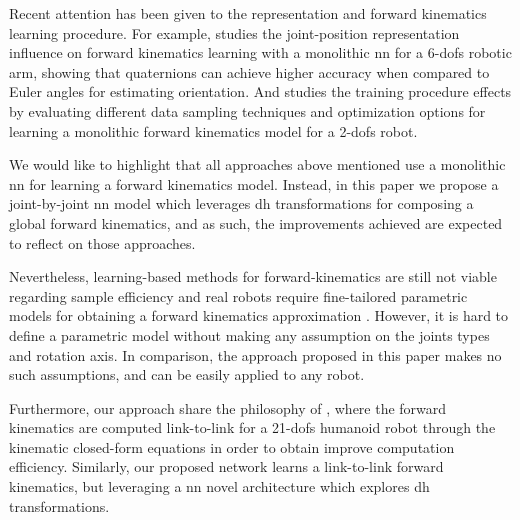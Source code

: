 Recent attention has been given to the representation and forward kinematics learning procedure.
%
For example, \cite{grassmann2019merits} studies the joint-position representation influence on forward kinematics learning  with a monolithic \gls{nn} for a 6-\glspl{dof} robotic arm, showing that quaternions can achieve higher accuracy when compared to Euler angles for estimating orientation.
%
And \cite{bouzid2024exploring} studies the training procedure effects by evaluating different data sampling techniques and optimization options for learning a monolithic forward kinematics model for a 2-\glspl{dof} robot.

We would like to highlight that all approaches above mentioned use a monolithic \gls{nn} for learning a forward kinematics model.
%
Instead, in this paper we propose a joint-by-joint \gls{nn} model which leverages \gls{dh} transformations for composing a global forward kinematics, and as such, the improvements achieved are expected to reflect on those approaches.


Nevertheless, learning-based methods for forward-kinematics are still not viable regarding sample efficiency and real robots require fine-tailored parametric models for obtaining a forward kinematics approximation \cite{kubus2018learning}.
%
However, it is hard to define a parametric model without making any assumption on the joints types and rotation axis.
%
In comparison, the approach proposed in this paper makes no such assumptions, and can be easily applied to any robot.

Furthermore, our approach share the philosophy of \cite{gonccalves2022recursive}, where the forward kinematics are computed link-to-link for a 21-\glspl{dof} humanoid robot through the kinematic closed-form equations in order to obtain improve computation efficiency.
%
Similarly, our proposed network learns a link-to-link forward kinematics, but leveraging a \gls{nn} novel architecture which explores \gls{dh} transformations.

%

